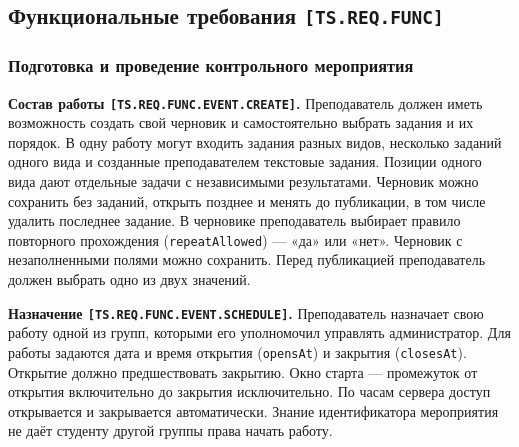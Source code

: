 \documentclass[12pt,a4paper]{article}
\begin{document}
\subsection{\texorpdfstring{Функциональные требования \texttt{[TS.\allowbreak{}REQ.\allowbreak{}FUNC]}}{Функциональные требования }}\label{31-ux444ux443ux43dux43aux446ux438ux43eux43dux430ux43bux44cux43dux44bux435-ux442ux440ux435ux431ux43eux432ux430ux43dux438ux44f-tsreqfunc}

\hypertarget{31-функциональные-требования-tsreqfunc}{}

\hypertarget{ts-req-func}{}

\subsubsection{Подготовка и проведение контрольного мероприятия}\label{ux43fux43eux434ux433ux43eux442ux43eux432ux43aux430-ux438-ux43fux440ux43eux432ux435ux434ux435ux43dux438ux435-ux43aux43eux43dux442ux440ux43eux43bux44cux43dux43eux433ux43e-ux43cux435ux440ux43eux43fux440ux438ux44fux442ux438ux44f}

\hypertarget{подготовка-и-проведение-контрольного-мероприятия}{}

\hypertarget{ts-req-func-event-create}{} \textbf{Состав работы \texttt{[TS.\allowbreak{}REQ.\allowbreak{}FUNC.\allowbreak{}EVENT.\allowbreak{}CREATE]}.} Преподаватель должен иметь возможность создать свой черновик и самостоятельно выбрать задания и их порядок. В одну работу могут входить задания разных видов, несколько заданий одного вида и созданные преподавателем текстовые задания. Позиции одного вида дают отдельные задачи с независимыми результатами. Черновик можно сохранить без заданий, открыть позднее и менять до публикации, в том числе удалить последнее задание. В черновике преподаватель выбирает правило повторного прохождения (\texttt{repeatAllowed}) --- «да» или «нет». Черновик с незаполненными полями можно сохранить. Перед публикацией преподаватель должен выбрать одно из двух значений.

\hypertarget{ts-req-func-event-schedule}{} \textbf{Назначение \texttt{[TS.\allowbreak{}REQ.\allowbreak{}FUNC.\allowbreak{}EVENT.\allowbreak{}SCHEDULE]}.} Преподаватель назначает свою работу одной из групп, которыми его уполномочил управлять администратор. Для работы задаются дата и время открытия (\texttt{opensAt}) и закрытия (\texttt{closesAt}). Открытие должно предшествовать закрытию. Окно старта --- промежуток от открытия включительно до закрытия исключительно. По часам сервера доступ открывается и закрывается автоматически. Знание идентификатора мероприятия не даёт студенту другой группы права начать работу.
\end{document}
